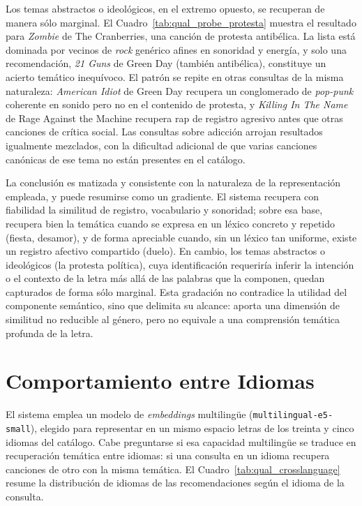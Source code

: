 

Los temas abstractos o ideológicos, en el extremo opuesto, se recuperan de manera sólo marginal. El Cuadro~\ref{tab:qual_probe_protesta} muestra el resultado para \emph{Zombie} de The Cranberries, una canción de protesta antibélica. La lista está dominada por vecinos de \textit{rock} genérico afines en sonoridad y energía, y solo una recomendación, \emph{21 Guns} de Green Day (también antibélica), constituye un acierto temático inequívoco. El patrón se repite en otras consultas de la misma naturaleza: \emph{American Idiot} de Green Day recupera un conglomerado de \textit{pop-punk} coherente en sonido pero no en el contenido de protesta, y \emph{Killing In The Name} de Rage Against the Machine recupera rap de registro agresivo antes que otras canciones de crítica social. Las consultas sobre adicción arrojan resultados igualmente mezclados, con la dificultad adicional de que varias canciones canónicas de ese tema no están presentes en el catálogo.



La conclusión es matizada y consistente con la naturaleza de la representación empleada, y puede resumirse como un gradiente. El sistema recupera con fiabilidad la similitud de registro, vocabulario y sonoridad; sobre esa base, recupera bien la temática cuando se expresa en un léxico concreto y repetido (fiesta, desamor), y de forma apreciable cuando, sin un léxico tan uniforme, existe un registro afectivo compartido (duelo). En cambio, los temas abstractos o ideológicos (la protesta política), cuya identificación requeriría inferir la intención o el contexto de la letra más allá de las palabras que la componen, quedan capturados de forma sólo marginal. Esta gradación no contradice la utilidad del componente semántico, sino que delimita su alcance: aporta una dimensión de similitud no reducible al género, pero no equivale a una comprensión temática profunda de la letra.

\section{Comportamiento entre Idiomas}
\label{sec:cross-language}

El sistema emplea un modelo de \textit{embeddings} multilingüe (\texttt{multilingual-e5-small}), elegido para representar en un mismo espacio letras de los treinta y cinco idiomas del catálogo. Cabe preguntarse si esa capacidad multilingüe se traduce en recuperación temática entre idiomas: si una consulta en un idioma recupera canciones de otro con la misma temática. El Cuadro~\ref{tab:qual_crosslanguage} resume la distribución de idiomas de las recomendaciones según el idioma de la consulta.


